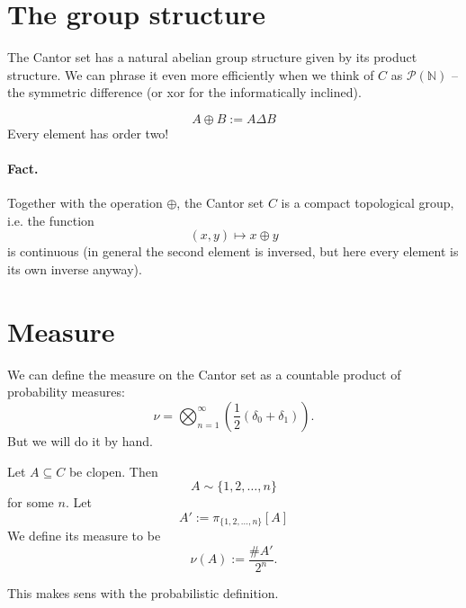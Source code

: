 
\section{The group structure}

The Cantor set has a natural abelian group structure given by its product structure. We can phrase it even more efficiently when we think of \( C \) as \( \mathcal{P}( \mathbb{N} ) \) -- the symmetric difference (or xor for the informatically inclined).

\[ 
    A \oplus B := A \Delta B 
\]
Every element has order two!

\paragraph{Fact.} Together with the operation \( \oplus \), the Cantor set \( C \) is a compact topological group, i.e. the function
\[ 
    (x, y) \mapsto x \oplus y 
\]
is continuous (in general the second element is inversed, but here every element is its own inverse anyway). 

\section{Measure}

We can define the measure on the Cantor set as a countable product of probability measures:
\[ 
    \nu = \bigotimes_{n=1}^\infty ( \frac{1}{2} (\delta_0 + \delta_1) ).
\]
But we will do it by hand.
\begin{defn}
Let \( A \subseteq C \) be clopen. Then
\[ 
    A \sim \{1, 2, \ldots, n\} 
\]
for some \( n \). Let
\[ 
    A' := \pi_{\{1, 2, \ldots, n\} }[A]
\]We define its measure to be
\[ 
    \nu (A) := \frac{\# A'}{2^n}.
\]
\end{defn}
This makes sens with the probabilistic definition.


